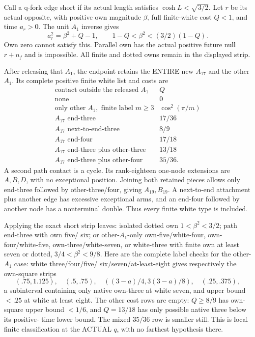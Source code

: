 \documentclass[11pt]{article}
\theoremstyle{definition}
\theoremstyle{remark}
\begin{document}
Call a q-fork edge short if its
actual length satisfies
\(\cosh L<\sqrt{3/2}\).
Let \(r\) be its actual opposite,
with positive own magnitude
\(\beta\), full finite-white
cost \(Q<1\), and time \(a_r>0\).
The unit \(A_1\) inverse gives
\[
 a_r^2=\beta^2+Q-1,\qquad
               1-Q<\beta^2<(3/2)(1-Q).
\tag{D19qshort}\label{app:exact19:eq:Dqshort}
\]
Own zero cannot satisfy this.
Parallel own has the actual
positive future null \(r+n_f\)
and is impossible.
All finite and dotted owns
remain in the displayed strip.

After releasing that \(A_1\),
the endpoint retains the ENTIRE
new \(A_{17}\) and the other
\(A_1\).
Its complete positive finite
white list and costs are
\[
\begin{array}{c|c}
 \text{contact outside the released }A_1&Q\\ \hline
 \text{none}&0\\
 \text{only other }A_1,\text{ finite label }m\ge3&\cos^2(\pi/m)\\
 A_{17}\text{ end-three}&17/36\\
 A_{17}\text{ next-to-end-three}&8/9\\
 A_{17}\text{ end-four}&17/18\\
 A_{17}\text{ end-three plus other-three}&13/18\\
 A_{17}\text{ end-three plus other-four}&35/36 .
\end{array}
\]
A second path contact is a cycle.
Its rank-eighteen one-node
extensions are \(A,B,D\), with
no exceptional position.
Joining both retained pieces
allows only end-three followed
by other-three/four, giving
\(A_{19},B_{19}\).
A next-to-end attachment plus
another edge has excessive
exceptional arms, and an end-four
followed by another node has
a nonterminal double.
Thus every finite white type
is included.

Applying the exact short strip
leaves:
isolated dotted own
\(1<\beta^2<3/2\);
path end-three with own five/
six; or other-\(A_1\)-only
own-five/white-four,
own-four/white-five,
own-three/white-seven, or
white-three with finite own
at least seven or dotted,
\(3/4<\beta^2<9/8\).
Here are the complete label
checks for the other-\(A_1\)
case: white three/four/five/
six/seven/at-least-eight gives
respectively the own-square
strips
\[
 (.75,1.125),\quad(.5,.75),\quad
 ((3-a)/4,3(3-a)/8),\quad(.25,.375),
\]
a subinterval containing only
native own-three at white seven,
and upper bound \(<.25\) at
white at least eight.
The other cost rows are empty:
\(Q\ge8/9\) has own-square
upper bound \(<1/6\), and
\(Q=13/18\) has only possible
native three below its positive-
time lower bound.
The mixed \(35/36\) row is
smaller still.
This is local finite classification
at the ACTUAL \(q\), with no
farthest hypothesis there.
\end{document}
